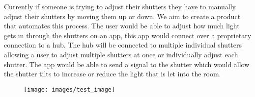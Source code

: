 Currently if someone is trying to adjust their shutters they have to manually adjust their shutters by moving them up or down. We aim to create a product that automates this process. The user would be able to adjust how much light gets in through the shutters on an app, this app would connect over a proprietary connection to a hub. The hub will be connected to multiple individual shutters allowing a user to adjust multiple shutters at once or individually adjust each shutter. The app would be able to send a signal to the shutter which would allow the shutter tilts to increase or reduce the light that is let into the room.

\begin{figure}[h!]
	\centering
   	\texttt{[image: images/test\_image]}
\end{figure}